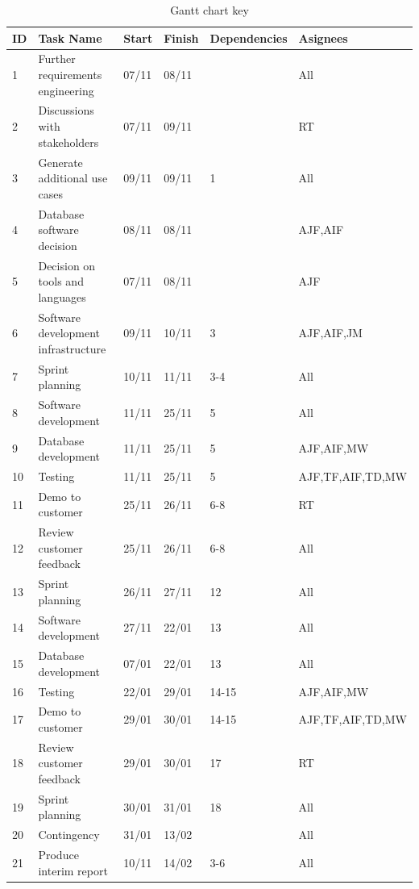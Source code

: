 \begin{table}[H]
\centering
\begin{tabular}{|p{0.6cm}|p{5.7cm}|p{1.1cm}|p{1.1cm}|p{2.4cm}|p{3.3cm}|}
	\hline
	\rowcolor{titleColor}\textbf{ID} & \textbf{Task Name} & \textbf{Start} & \textbf{Finish} & \textbf{Dependencies} & \textbf{Asignees} \\ \hline
	1 & Further requirements engineering & 07/11 & 08/11 &  & All \\ \hline
	2 & Discussions with stakeholders & 07/11 & 09/11 &  & RT \\ \hline
	3 & Generate additional use cases & 09/11 & 09/11 & 1 & All \\ \hline
	4 & Database software decision & 08/11 & 08/11 &  & AJF,AIF \\ \hline
	5 & Decision on tools and languages & 07/11 & 08/11 &  & AJF \\ \hline
	6 & Software development infrastructure & 09/11 & 10/11 & 3 & AJF,AIF,JM \\ \hline
	7 & Sprint planning & 10/11 & 11/11 & 3-4 & All \\ \hline
	8 & Software development & 11/11 & 25/11 & 5 & All \\ \hline
	9 & Database development & 11/11 & 25/11 & 5 & AJF,AIF,MW \\ \hline
	10 & Testing & 11/11 & 25/11 & 5 & AJF,TF,AIF,TD,MW \\ \hline
	11 & Demo to customer & 25/11 & 26/11 & 6-8 & RT \\ \hline
	12 & Review customer feedback & 25/11 & 26/11 & 6-8 & All \\ \hline
	13 & Sprint planning & 26/11 & 27/11 & 12 & All \\ \hline
	14 & Software development & 27/11 & 22/01 & 13 & All \\ \hline
	15 & Database development & 07/01 & 22/01 & 13 & All \\ \hline
	16 & Testing & 22/01 & 29/01 & 14-15 & AJF,AIF,MW \\ \hline
	17 & Demo to customer & 29/01 & 30/01 & 14-15 & AJF,TF,AIF,TD,MW \\ \hline
	18 & Review customer feedback & 29/01 & 30/01 & 17 & RT \\ \hline
	19 & Sprint planning & 30/01 & 31/01 & 18 & All \\ \hline
	20 & Contingency & 31/01 & 13/02 &  & All \\ \hline
	21 & Produce interim report & 10/11 & 14/02 & 3-6 & All \\ \hline
\end{tabular}
\caption{Gantt chart key}
\label{tab:gantt}
\end{table}
